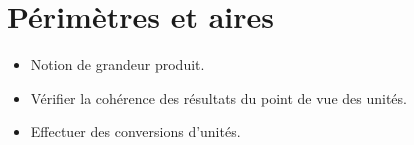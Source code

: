 \themaM
\graphicspath{{../S03_Aires_et_perimetres/Images/}}

\def\curvica#1{
   \begin{pspicture}(-1,-0.25)(3,2.5)
   #1
   \psset{linewidth=0.4mm,linestyle=dotted} %
      \psframe(0,0)(2,2)
      \psarc(1,4){2.24}{-116.6}{-63.4}
      \psarc(1,0){2.24}{63.4}{116.6}
      \psarc(1,2){2.24}{-116.6}{-63.4}
      \psarc(1,-2){2.24}{63.4}{116.6}
      \psarc(4,1){2.24}{153.4}{-153.4}
      \psarc(0,1){2.24}{-26.6}{26.6}
      \psarc(2,1){2.24}{153.4}{-153.4}
      \psarc(-2,1){2.24}{-26.6}{26.6}
      \end{pspicture}
      }

\chapter{Périmètres et aires}
\label{S03}


\begin{prerequis}
   \begin{itemize}
      \item Notion de grandeur produit.
      \item[\com] Vérifier la cohérence des résultats du point de vue des unités.
      \item[\com] Effectuer des conversions d’unités.
   \end{itemize}
\end{prerequis}

\vfill

